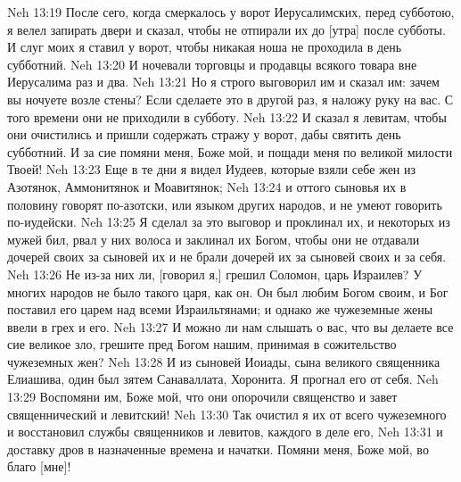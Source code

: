 Neh 13:19  После сего, когда смеркалось у ворот Иерусалимских, перед субботою, я велел запирать двери и сказал, чтобы не отпирали их до [утра] после субботы. И слуг моих я ставил у ворот, чтобы никакая ноша не проходила в день субботний.
Neh 13:20  И ночевали торговцы и продавцы всякого товара вне Иерусалима раз и два.
Neh 13:21  Но я строго выговорил им и сказал им: зачем вы ночуете возле стены? Если сделаете это в другой раз, я наложу руку на вас. С того времени они не приходили в субботу.
Neh 13:22  И сказал я левитам, чтобы они очистились и пришли содержать стражу у ворот, дабы святить день субботний. И за сие помяни меня, Боже мой, и пощади меня по великой милости Твоей!
Neh 13:23  Еще в те дни я видел Иудеев, которые взяли себе жен из Азотянок, Аммонитянок и Моавитянок;
Neh 13:24  и оттого сыновья их в половину говорят по-азотски, или языком других народов, и не умеют говорить по-иудейски.
Neh 13:25  Я сделал за это выговор и проклинал их, и некоторых из мужей бил, рвал у них волоса и заклинал их Богом, чтобы они не отдавали дочерей своих за сыновей их и не брали дочерей их за сыновей своих и за себя.
Neh 13:26  Не из-за них ли, [говорил я,] грешил Соломон, царь Израилев? У многих народов не было такого царя, как он. Он был любим Богом своим, и Бог поставил его царем над всеми Израильтянами; и однако же чужеземные жены ввели в грех и его.
Neh 13:27  И можно ли нам слышать о вас, что вы делаете все сие великое зло, грешите пред Богом нашим, принимая в сожительство чужеземных жен?
Neh 13:28  И из сыновей Иоиады, сына великого священника Елиашива, один был зятем Санаваллата, Хоронита. Я прогнал его от себя.
Neh 13:29  Воспомяни им, Боже мой, что они опорочили священство и завет священнический и левитский!
Neh 13:30  Так очистил я их от всего чужеземного и восстановил службы священников и левитов, каждого в деле его,
Neh 13:31  и доставку дров в назначенные времена и начатки. Помяни меня, Боже мой, во благо [мне]!


